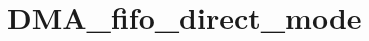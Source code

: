 \hypertarget{group___d_m_a__fifo__direct__mode}{\section{D\-M\-A\-\_\-fifo\-\_\-direct\-\_\-mode}
\label{group___d_m_a__fifo__direct__mode}
}
